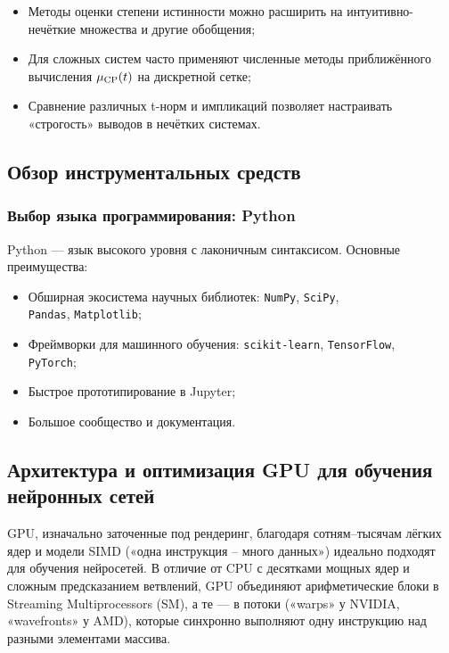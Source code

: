 \begin{remark}
\leavevmode
\begin{itemize}
  \item Методы оценки степени истинности можно расширить на интуитивно-нечёткие множества и другие обобщения;
  \item Для сложных систем часто применяют численные методы приближённого вычисления $\mu_{\operatorname{CP}}(t)$ на дискретной сетке;
  \item Сравнение различных t-норм и импликаций позволяет настраивать «строгость» выводов в нечётких системах.
\end{itemize}
\end{remark}

\subsection{Обзор инструментальных средств}
\label{sec:tools}

\subsubsection{Выбор языка программирования: Python}
\label{sec:tools_python}

Python — язык высокого уровня с лаконичным синтаксисом. Основные преимущества:
\begin{itemize}
  \item Обширная экосистема научных библиотек: \texttt{NumPy}, \texttt{SciPy}, \\ \texttt{Pandas}, \texttt{Matplotlib};
  \item Фреймворки для машинного обучения: \texttt{scikit-learn}, \texttt{TensorFlow}, \\ \texttt{PyTorch};
  \item Быстрое прототипирование в Jupyter;
  \item Большое сообщество и документация.
\end{itemize}

\subsection{Архитектура и оптимизация GPU для обучения нейронных сетей}
\label{ssec:gpu_architecture}

GPU, изначально заточенные под рендеринг, благодаря сотням–тысячам лёгких ядер и модели SIMD («одна инструкция – много данных») идеально подходят для обучения нейросетей. В отличие от CPU с десятками мощных ядер и сложным предсказанием ветвлений, GPU объединяют арифметические блоки в Streaming Multiprocessors (SM), а те — в потоки («warps» у NVIDIA, «wavefronts» у AMD), которые синхронно выполняют одну инструкцию над разными элементами массива.

